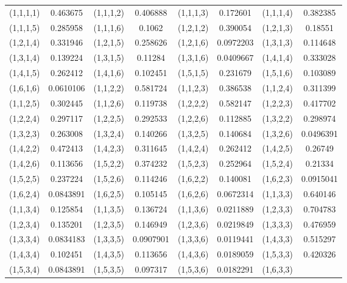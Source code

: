 \documentclass[hidelinks]{ctexart}
\begin{document}
\begin{longtable}{cccccccc}
    (1,1,1,1) & 
0.463675
 & 
(1,1,1,2) & 
0.406888
 & 
(1,1,1,3) & 
0.172601
 & 
(1,1,1,4) & 
0.382385
\\
(1,1,1,5) & 
0.285958
 & 
(1,1,1,6) & 
0.1062
 & 
(1,2,1,2) & 
0.390054
 & 
(1,2,1,3) & 
0.18551
\\
(1,2,1,4) & 
0.331946
 & 
(1,2,1,5) & 
0.258626
 & 
(1,2,1,6) & 
0.0972203
 & 
(1,3,1,3) & 
0.114648
\\
(1,3,1,4) & 
0.139224
 & 
(1,3,1,5) & 
0.11284
 & 
(1,3,1,6) & 
0.0409667
 & 
(1,4,1,4) & 
0.333028
\\
(1,4,1,5) & 
0.262412
 & 
(1,4,1,6) & 
0.102451
 & 
(1,5,1,5) & 
0.231679
 & 
(1,5,1,6) & 
0.103089
\\
(1,6,1,6) & 
0.0610106
 & 
(1,1,2,2) & 
0.581724
 & 
(1,1,2,3) & 
0.386538
 & 
(1,1,2,4) & 
0.311399
\\
(1,1,2,5) & 
0.302445
 & 
(1,1,2,6) & 
0.119738
 & 
(1,2,2,2) & 
0.582147
 & 
(1,2,2,3) & 
0.417702
\\
(1,2,2,4) & 
0.297117
 & 
(1,2,2,5) & 
0.292533
 & 
(1,2,2,6) & 
0.112885
 & 
(1,3,2,2) & 
0.298974
\\
(1,3,2,3) & 
0.263008
 & 
(1,3,2,4) & 
0.140266
 & 
(1,3,2,5) & 
0.140684
 & 
(1,3,2,6) & 
0.0496391
\\
(1,4,2,2) & 
0.472413
 & 
(1,4,2,3) & 
0.311645
 & 
(1,4,2,4) & 
0.262412
 & 
(1,4,2,5) & 
0.26749
\\
(1,4,2,6) & 
0.113656
 & 
(1,5,2,2) & 
0.374232
 & 
(1,5,2,3) & 
0.252964
 & 
(1,5,2,4) & 
0.21334
\\
(1,5,2,5) & 
0.237224
 & 
(1,5,2,6) & 
0.114246
 & 
(1,6,2,2) & 
0.140081
 & 
(1,6,2,3) & 
0.0915041
\\
(1,6,2,4) & 
0.0843891
 & 
(1,6,2,5) & 
0.105145
 & 
(1,6,2,6) & 
0.0672314
 & 
(1,1,3,3) & 
0.640146
\\
(1,1,3,4) & 
0.125854
 & 
(1,1,3,5) & 
0.136724
 & 
(1,1,3,6) & 
0.0211889
 & 
(1,2,3,3) & 
0.704783
\\
(1,2,3,4) & 
0.135201
 & 
(1,2,3,5) & 
0.146949
 & 
(1,2,3,6) & 
0.0219849
 & 
(1,3,3,3) & 
0.476959
\\
(1,3,3,4) & 
0.0834183
 & 
(1,3,3,5) & 
0.0907901
 & 
(1,3,3,6) & 
0.0119441
 & 
(1,4,3,3) & 
0.515297
\\
(1,4,3,4) & 
0.102451
 & 
(1,4,3,5) & 
0.113656
 & 
(1,4,3,6) & 
0.0189059
 & 
(1,5,3,3) & 
0.420326
\\
(1,5,3,4) & 
0.0843891
 & 
(1,5,3,5) & 
0.097317
 & 
(1,5,3,6) & 
0.0182291
 & 
(1,6,3,3) & 

\end{longtable}
\end{document}
